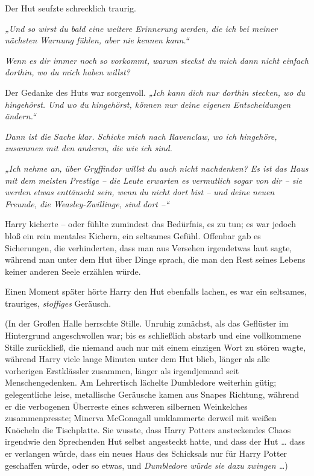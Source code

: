 Der Hut seufzte schrecklich traurig. 

\emph{„Und so wirst du bald eine weitere Erinnerung werden, die ich bei meiner nächsten Warnung fühlen, aber nie kennen kann.“ }

\emph{Wenn es dir immer noch so vorkommt, warum steckst du mich dann nicht einfach dorthin, wo du mich haben willst?} 

Der Gedanke des Huts war sorgenvoll. \emph{„Ich kann dich nur dorthin stecken, wo du hingehörst. Und wo du hingehörst, können nur deine eigenen Entscheidungen ändern.“ }

\emph{Dann ist die Sache klar. Schicke mich nach Ravenclaw, wo ich hingehöre, zusammen mit den anderen, die wie ich sind. }

\emph{„Ich nehme an, über Gryffindor willst du auch nicht nachdenken? Es ist das Haus mit dem meisten Prestige – die Leute erwarten es vermutlich sogar von dir – sie werden etwas enttäuscht sein, wenn du nicht dort bist – und deine neuen Freunde, die Weasley-Zwillinge, sind dort –“} 

Harry kicherte – oder fühlte zumindest das Bedürfnis, es zu tun; es war jedoch bloß ein rein mentales Kichern, ein seltsames Gefühl. Offenbar gab es Sicherungen, die verhinderten, dass man aus Versehen irgendetwas laut sagte, während man unter dem Hut über Dinge sprach, die man den Rest seines Lebens keiner anderen Seele erzählen würde. 

Einen Moment später hörte Harry den Hut ebenfalls lachen, es war ein seltsames, trauriges, \emph{stoffiges} Geräusch. 

(In der Großen Halle herrschte Stille. Unruhig zunächst, als das Geflüster im Hintergrund angeschwollen war; bis es schließlich abstarb und eine vollkommene Stille zurückließ, die niemand auch nur mit einem einzigen Wort zu stören wagte, während Harry viele lange Minuten unter dem Hut blieb, länger als alle vorherigen Erstklässler zusammen, länger als irgendjemand seit Menschengedenken. Am Lehrertisch lächelte Dumbledore weiterhin gütig; gelegentliche leise, metallische Geräusche kamen aus Snapes Richtung, während er die verbogenen Überreste eines schweren silbernen Weinkelches zusammenpresste; Minerva McGonagall umklammerte derweil mit weißen Knöcheln die Tischplatte. Sie wusste, dass Harry Potters ansteckendes Chaos irgendwie den Sprechenden Hut selbst angesteckt hatte, und dass der Hut … dass er verlangen würde, dass ein neues Haus des Schicksals nur für Harry Potter geschaffen würde, oder so etwas, und \emph{Dumbledore würde sie dazu zwingen …}) 

